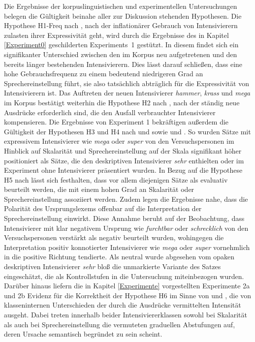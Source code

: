 Die Ergebnisse der korpuslinguistischen und experimentellen Untersuchungen belegen die Gültigkeit beinahe aller zur Diskussion stehenden Hypothesen. Die Hypothese H1-Freq nach \citet[2]{Hauschild.1899}, nach der inflationärer Gebrauch von Intensivierern zulasten ihrer Expressivität geht, wird durch die Ergebnisse des in Kapitel \ref{Experiment0} geschilderten \mbox{Experiments 1} gestützt. In diesem findet sich ein signifikanter Unterschied zwischen den im Korpus neu aufgetretenen und den bereits länger bestehenden Intensivierern. Dies lässt darauf schließen, dass eine hohe Gebrauchsfrequenz zu einem bedeutend niedrigeren Grad an Sprechereinstellung führt, sie also tatsächlich abträglich für die Expressivität von Intensivierern ist. Das Auftreten der neuen Intensivierer \textit{hammer}, \textit{krass} und \textit{mega} im Korpus bestätigt weiterhin die Hypothese H2 nach \citet[274]{Baumgarten.1908}, nach der ständig neue Ausdrücke erforderlich sind, die den Ausfall verbrauchter Intensivierer kompensieren. Die Ergebnisse von Experiment 1 bekräftigen außerdem die Gültigkeit der Hypothesen H3 und H4 nach \citet[22]{Paradis.1997} und \citet[133]{Gutzmann.2019a} sowie \citet[315]{Lang.1983} und \citet[57]{Ortner.2014}. So wurden Sätze mit expressivem Intensivierer wie \textit{mega} oder \textit{super} von den Versuchspersonen im Hinblick auf Skalarität und Sprechereinstellung auf der Skala signifikant höher positioniert als Sätze, die den deskriptiven Intensivierer \textit{sehr} enthielten oder im Experiment ohne Intensivierer präsentiert wurden. In Bezug auf die Hypothese H5 nach \citet[135]{Gutzmann.2019a} lässt sich festhalten, dass vor allem diejenigen Sätze als evaluativ beurteilt werden, die mit einem hohen Grad an Skalarität oder Sprechereinstellung assoziiert werden. Zudem legen die Ergebnisse nahe, dass die Polarität des Ursprungslexems offenbar auf die Interpretation der Sprechereinstellung einwirkt. Diese Annahme beruht auf der Beobachtung, dass Intensivierer mit klar negativem Ursprung wie \textit{furchtbar} oder \textit{schrecklich} von den Versuchspersonen verstärkt als negativ beurteilt wurden, wohingegen die Interpretation positiv konnotierter Intensivierer wie \textit{mega} oder \textit{super} vornehmlich in die positive Richtung tendierte. Als neutral wurde abgesehen vom opaken deskriptiven Intensivierer \textit{sehr} bloß die unmarkierte Variante des Satzes eingeschätzt, die als Kontrollstufen in die Untersuchung miteinbezogen wurden. Darüber hinaus liefern die in Kapitel \ref{Experimente} vorgestellten Experimente 2a und 2b Evidenz für die Korrektheit der Hypothese H6 im Sinne von \citet[87]{Biedermann.1969} und \citet[408]{Breindl.2007}, die von klasseninternen Unterschieden der durch die Ausdrücke vermittelten Intensität ausgeht. Dabei treten innerhalb beider Intensiviererklassen sowohl bei Skalarität als auch bei Sprechereinstellung die vermuteten graduellen Abstufungen auf, deren Ursache semantisch begründet zu sein scheint.


